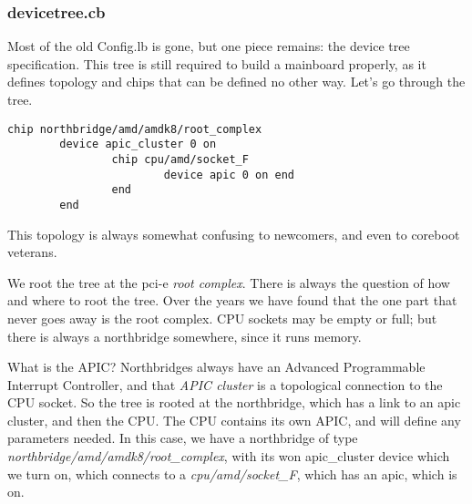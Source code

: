 \documentclass[10pt,letterpaper]{article}
\begin{document}
\subsubsection{devicetree.cb}
Most of the old Config.lb is gone, but one piece remains: the device tree specification. This tree is still required to build a mainboard
properly, as it defines topology and chips that can be defined no other way. 
Let's go through the tree. 
\begin{verbatim}
chip northbridge/amd/amdk8/root_complex
        device apic_cluster 0 on
                chip cpu/amd/socket_F
                        device apic 0 on end
                end
        end
\end{verbatim}
This topology is always somewhat confusing to newcomers, and even to coreboot veterans. 

We root the tree at the pci-e {\it root complex}. There is always the question of how and where to root the tree. Over the years we 
have found that the one part that never goes away is the root complex. CPU sockets may be empty or full; but there is always a northbridge
somewhere, since it runs memory. 


What is the APIC? Northbridges always have an Advanced Programmable Interrupt Controller, and that {\it APIC cluster} is a topological connection to the 
CPU socket. So the tree is rooted at the northbridge, which has a link to an apic cluster, and then the CPU. The CPU contains 
its own APIC, and will define any parameters needed. In this case, we have a northbridge of type 
{\it northbridge/amd/amdk8/root\_complex}, with its won apic\_cluster device which we turn on, 
which connects to a {\it cpu/amd/socket\_F}, 
which has an apic, which is on. 
\end{document}
